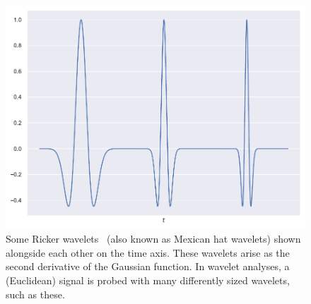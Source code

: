 \begin{figure}[htpb]
	\centering\capstart{}
	\includegraphics[width=\textwidth]{ricker_wavelets.pdf}
	\caption[
        A few Ricker wavelets
	]{
        Some Ricker wavelets~\cite{Ricker1953} (also known as Mexican hat wavelets) shown alongside each other on the time axis.
        These wavelets arise as the second derivative of the Gaussian function.
        In wavelet analyses, a (Euclidean) signal is probed with many differently sized wavelets, such as these.
	}\label{fig:chapter2_ricker_wavelets}
\end{figure}
